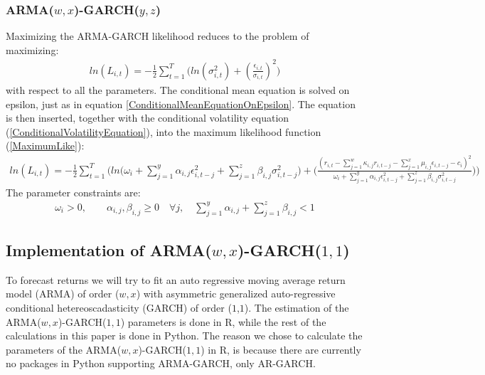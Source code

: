 \subsubsection{ARMA($w,x$)-GARCH($y,z$)}
Maximizing the ARMA-GARCH likelihood reduces to the problem of maximizing:
\begin{align} 
    ln(L_{i,t})=-\frac{1}{2}\sum_{t=1}^T\bigg( ln(\sigma_{i,t}^2)+(\frac{\epsilon_{i,t}}{\sigma_{i,t}})^2\bigg)   \label{MaximumLike}
\end{align}
with respect to all the parameters. The conditional mean equation is solved on epsilon, just as in equation \ref{ConditionalMeanEquationOnEpsilon}. The equation is then inserted, together with the conditional volatility equation (\ref{ConditionalVolatilityEquation}), into the maximum likelihood function (\ref{MaximumLike}):
\begin{align} 
    ln(L_{i,t})=-\frac{1}{2}\sum_{t=1}^T \Bigg(ln\Big(\omega_i + \sum_{j=1}^y\alpha_{i,j}\epsilon_{i,t-j}^2+\sum_{j=1}^z\beta_{i,j}\sigma_{i,t-j}^2\big)+\Big(\frac{(r_{i,t}-\sum_{j=1}^w\kappa_{i,j} r_{i,t-j}-\sum_{j=1}^x\mu_{i,j} \epsilon_{i,t-j}-c_i)^2}{\omega_i + \sum_{j=1}^y \alpha_{i,j} \epsilon_{i,t-j}^2 +\sum_{j=1}^z\beta_{i,j}\sigma_{i,t-j}^2}\Big)\Bigg)   \label{fullMaximumLike}
\end{align}
The parameter constraints are:
\begin{align} 
    \omega_i>0,\quad\quad \alpha_{i,j},\beta_{i,j}\geq0 \quad \forall j, \quad \sum_{j=1}^y\alpha_{i,j}+\sum_{j=1}^z\beta_{i,j}<1 \label{ParameterConstraints}
\end{align}

\subsection*{Implementation of ARMA($w,x$)-GARCH($1,1$)}
To forecast returns we will try to fit an auto regressive moving average return model (ARMA) of order ($w,x$) with asymmetric generalized auto-regressive conditional hetereoscadasticity (GARCH) of order ($1$,$1$). The estimation of the ARMA($w,x$)-GARCH($1,1$) parameters is done in R, while the rest of the calculations in this paper is done in Python. The reason we chose to calculate the parameters of the ARMA($w,x$)-GARCH($1,1$) in R, is because there are currently no packages in Python supporting ARMA-GARCH, only AR-GARCH. 

